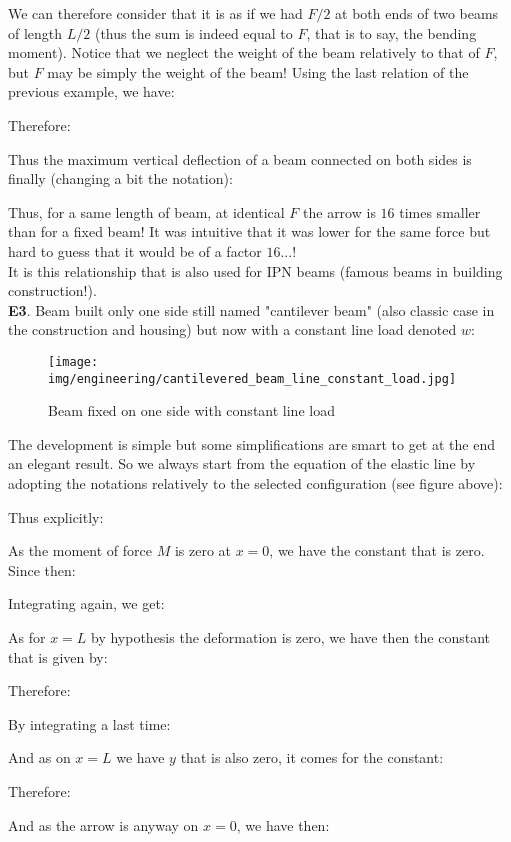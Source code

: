 	\begin{tcolorbox}[colframe=black,colback=white,sharp corners]
	We can therefore consider that it is as if we had $F / 2$ at both ends of two beams of length $L / 2$ (thus the sum is indeed equal to $F$, that is to say, the bending moment). Notice that we neglect the weight of the beam relatively to that of $F$, but $F$ may be simply the weight of the beam! Using the last relation of the previous example, we have:
	
	Therefore:
	
	Thus the maximum vertical deflection of a beam connected on both sides is finally (changing a bit the notation):
	
	Thus, for a same length of beam, at identical $F$ the arrow  is $16$ times smaller than for a fixed beam! It was intuitive that it was lower for the same force but hard to guess that it would be of a factor $16$...!\\

	It is this relationship that is also used for IPN beams (famous beams in building construction!).\\

	\textbf{E3}. Beam built only one side still named "cantilever beam" (also classic case in the construction and housing) but now with a constant line load denoted $w$:
	\begin{figure}[H]
		\centering
		\texttt{[image: img/engineering/cantilevered\_beam\_line\_constant\_load.jpg]}
		\caption{Beam fixed on one side with constant line load}
	\end{figure}
	\end{tcolorbox}
	
	\begin{tcolorbox}[colframe=black,colback=white,sharp corners]
	The development is simple but some simplifications are smart to get at the end an elegant result. So we always start from the equation of the elastic line by adopting the notations relatively to the selected configuration (see figure above):
	
	Thus explicitly:
	
		As the moment of force $M$ is zero at $x = 0$, we have the constant that is zero. Since then:
	
	Integrating again, we get:
	
	As for $x=L$ by hypothesis the deformation is zero, we have then the constant that is given by:
	
	Therefore:
	
	By integrating a last time:
	
	And as on $x=L$ we have $y$ that is also zero, it comes for the constant:
	
	Therefore:
	
	And as the arrow is anyway on $x=0$, we have then:
	
	
	\end{tcolorbox}
	
